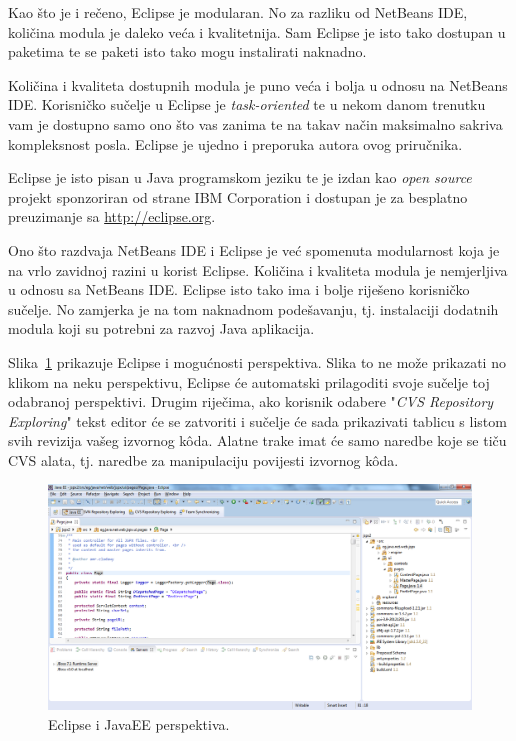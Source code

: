 Kao što je i rečeno, Eclipse je modularan. No za razliku od NetBeans IDE, količina modula je daleko veća i kvalitetnija. Sam Eclipse je isto tako dostupan u paketima te se paketi isto tako mogu instalirati naknadno.

\begin{infobox}
    Količina i kvaliteta dostupnih modula je puno veća i bolja u odnosu na NetBeans IDE. Korisničko sučelje u Eclipse je \emph{task-oriented} te u nekom danom trenutku vam je dostupno samo ono što vas zanima te na takav način maksimalno sakriva kompleksnost posla. Eclipse je ujedno i preporuka autora ovog priručnika.
\end{infobox}

Eclipse je isto pisan u Java programskom jeziku te je izdan kao \emph{open source} projekt sponzoriran od strane IBM Corporation i dostupan je za besplatno preuzimanje sa \url{http://eclipse.org}.

Ono što razdvaja NetBeans IDE i Eclipse je već spomenuta modularnost koja je na vrlo zavidnoj razini u korist Eclipse. Količina i kvaliteta modula je nemjerljiva u odnosu sa NetBeans IDE. Eclipse isto tako ima i bolje riješeno korisničko sučelje. No zamjerka je na tom naknadnom podešavanju, tj. instalaciji dodatnih modula koji su potrebni za razvoj Java aplikacija.

Slika~\ref{fig:eclipse_overview} prikazuje Eclipse i mogućnosti perspektiva. Slika to ne može prikazati no klikom na neku perspektivu, Eclipse će automatski prilagoditi svoje sučelje toj odabranoj perspektivi. Drugim riječima, ako korisnik odabere "\emph{CVS Repository Exploring}" tekst editor će se zatvoriti i sučelje će sada prikazivati tablicu s listom svih revizija vašeg izvornog kôda. Alatne trake imat će samo naredbe koje se tiču CVS alata, tj. naredbe za manipulaciju povijesti izvornog kôda.

\begin{figure}[!htbp]
    \caption{Eclipse i JavaEE perspektiva.}
    \label{fig:eclipse_overview}
    \centering
    \includegraphics[max width=\textwidth]{images/eclipse_overview.png}
\end{figure}

